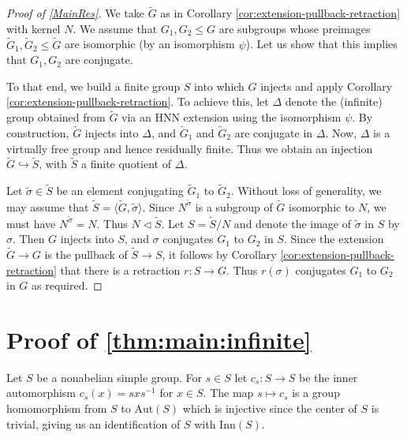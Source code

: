 \documentclass[11pt]{amsart}
\numberwithin{equation}{section}
\begin{document}
\begin{proof}[Proof of \cref{MainRes}]
We take $\widetilde G$ as in Corollary \ref{cor:extension-pullback-retraction} with kernel $N$. We assume that $G_1, G_2 \le G$ are subgroups whose preimages $\widetilde G_1, \widetilde G_2 \le \widetilde G$ are isomorphic (by an isomorphism $\psi$). Let us show that this implies that $G_1, G_2$ are conjugate.
    
To that end, we build a finite group $S$ into which $G$ injects and apply Corollary \ref{cor:extension-pullback-retraction}. To achieve this, let $\Delta$ denote the (infinite) group obtained from $\widetilde G$ via an HNN extension using the isomorphism $\psi$. By construction, $\widetilde G$ injects into $\Delta$, and $\widetilde G_1$ and $\widetilde G_2$ are conjugate in $\Delta$. Now, $\Delta$ is a virtually free group and hence residually finite. Thus we obtain an injection $\widetilde G \hookrightarrow \widetilde S$, with $\widetilde S$ a finite quotient of $\Delta$.
    
Let $\widetilde \sigma \in \widetilde S$ be an element conjugating $\widetilde G_1$ to $\widetilde G_2$. Without loss of generality, we may assume that $\widetilde S = \langle\widetilde G, \widetilde \sigma\rangle$. Since $N^{\widetilde \sigma}$ is a subgroup of $\widetilde G$ isomorphic to $N$, we must have $N^{\widetilde \sigma} = N$. Thus $N \triangleleft \widetilde S$. Let $S = \widetilde S/N$ and denote the image of $\widetilde \sigma$ in $S$ by $\sigma$. Then $G$ injects into $S$, and $\sigma$ conjugates $G_1$ to $G_2$ in $S$. Since the extension $\widetilde G \to G$ is the pullback of $\widetilde S \to S$, it follows by Corollary \ref{cor:extension-pullback-retraction} that there is a retraction $r \colon S \to G$. Thus $r(\sigma)$ conjugates $G_1$ to $G_2$ in $G$ as required. 
\end{proof}

\section{Proof of \cref{thm:main:infinite}}

Let $S$ be a nonabelian simple group.
For $s\in S$ let $c_s \colon S \to S$ be the inner automorphism $c_s(x) = sxs^{-1}$ for $x \in S$.
The map $s \mapsto c_s$ is a group homomorphism from $S$ to $\mathrm{Aut}(S)$ which is injective since the center of $S$ is trivial, giving us an identification of $S$ with $\mathrm{Inn}(S)$.
\end{document}
